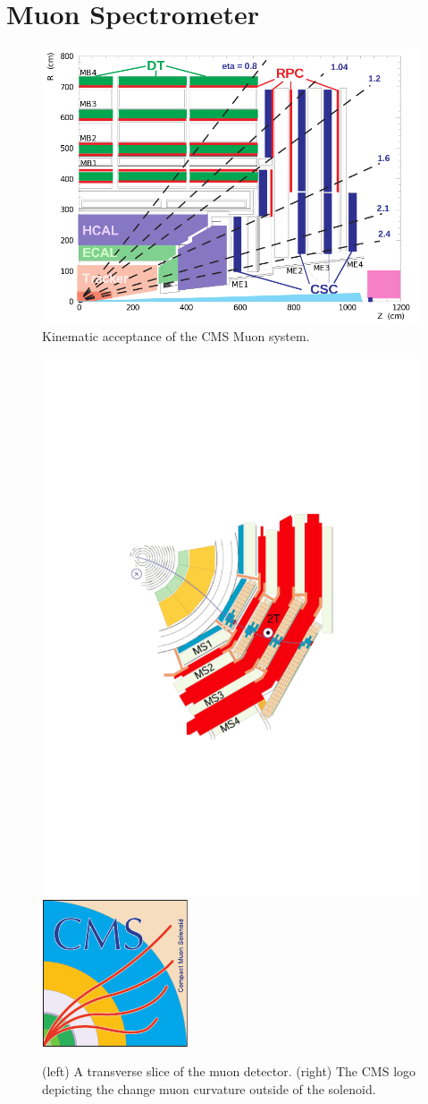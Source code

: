 \section{Muon Spectrometer}

\begin{figure}
\begin{center}
\includegraphics[width=.85\textwidth]{pics/muon_diagram}
\end{center}
\caption{Kinematic acceptance of the CMS Muon system.}
\label{fig:muon_diagram}
\end{figure}

\begin{figure}
\begin{center}
\includegraphics[width=.45\textwidth]{pics/muon_slice}
\includegraphics[width=.45\textwidth]{pics/cms_logo}
\end{center}
\caption{(left) A transverse slice of the muon detector. (right) The CMS logo depicting the change muon 
curvature outside of the solenoid.}
\label{fig:muon_slice}
\end{figure}

